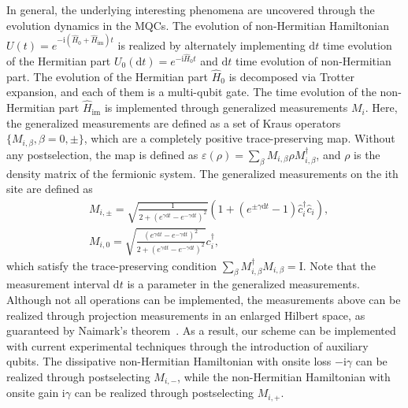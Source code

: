 \documentclass[longbibliography, aps, prx, amsmath, amssymb, amsfonts, twocolumn,superscriptaddress, footinbib]{revtex4-1}
\begin{document}
	In general, the underlying interesting phenomena are uncovered through the evolution dynamics in the MQCs. The evolution of non-Hermitian Hamiltonian $U(t) = e^{-\mathrm{i}(\hat{H}_0 + \hat{H}_{\text{im}})t}$ is realized by alternately implementing $\mathrm{d} t$ time evolution of the Hermitian part $U_0(\mathrm{d}t)=e^{-\mathrm{i}\hat{H}_0 t}$ and $\mathrm{d} t$ time evolution of non-Hermitian part. 
	The evolution of the Hermitian part $\hat{H}_0$ is decomposed via Trotter expansion, and each of them is a multi-qubit gate. 
	The time evolution of the non-Hermitian part $\hat{H}_{\text{im}}$ is implemented through generalized measurements $M_i$.
	Here, the generalized measurements are defined as a set of Kraus operators $\{M_{i,\beta},\beta=0,\pm \}$, which are a completely positive trace-preserving map. Without any postselection, the map is defined as
	$\varepsilon(\rho) = \sum_{\beta} M_{i, \beta} \rho M_{i, \beta}^{\dagger}$, and $\rho$ is the density matrix of the fermionic system.
	The generalized measurements on the ith site are defined as
	\begin{align}
		&M_{i,\pm} = \sqrt{\frac{1}{2+(e^{\gamma \mathrm{d} t} - e^{-\gamma \mathrm{d} t})^2}} (1 + (e^{\pm \gamma \mathrm{d} t}-1) \hat{c}_i^{\dagger} \hat{c}_i),\\
		&M_{i,0} = \sqrt{\frac{(e^{\gamma \mathrm{d} t} - e^{-\gamma \mathrm{d} t})^2}{2+(e^{\gamma \mathrm{d} t} - e^{-\gamma \mathrm{d} t})^2}} c_i^{\dagger},
	\end{align}
	which satisfy the trace-preserving condition $\sum_{\beta} M_{i,\beta}^{\dagger} M_{i,\beta}=\mathrm{I}$. 
	Note that the measurement interval $\mathrm{d}t$ is a parameter in the generalized measurements. 
	Although not all operations can be implemented, the measurements above can be realized through projection measurements in an enlarged Hilbert space, as guaranteed by Naimark's theorem~\cite{coecke2008povms,nielsen2001quantum}. As a result, our scheme can be implemented with current experimental techniques through the introduction of auxiliary qubits.
	The dissipative non-Hermitian Hamiltonian with onsite loss $-\mathrm{i}\gamma$ can be realized through postselecting $M_{i,-}$, while the non-Hermitian Hamiltonian with onsite gain $\mathrm{i}\gamma$ can be realized through postselecting $M_{i,+}$. 
	
\end{document}
